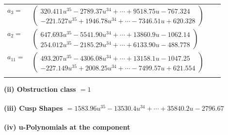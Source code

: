\documentclass[1p]{elsarticle_modified}
\theoremstyle{definition}
\begin{document}
\begin{tabular}{m{7pt} m{180pt} m{7pt} m{180pt} }
\flushright $a_{3}=$&$\begin{pmatrix}320.411 u^{35}-2789.37 u^{34}+\cdots+9518.75 u-767.324\\-221.527 u^{35}+1946.78 u^{34}+\cdots-7346.51 u+620.328\end{pmatrix}$ \\
\flushright $a_{2}=$&$\begin{pmatrix}647.693 u^{35}-5541.90 u^{34}+\cdots+13860.9 u-1062.14\\254.012 u^{35}-2185.29 u^{34}+\cdots+6133.90 u-488.778\end{pmatrix}$ \\
\flushright $a_{11}=$&$\begin{pmatrix}493.207 u^{35}-4306.08 u^{34}+\cdots+13158.1 u-1047.25\\-227.149 u^{35}+2008.25 u^{34}+\cdots-7499.57 u+621.554\end{pmatrix}$\\&\end{tabular}
\flushleft \textbf{(ii) Obstruction class $= 1$}\\~\\
\flushleft \textbf{(iii) Cusp Shapes $= 1583.96 u^{35}-13530.4 u^{34}+\cdots+35840.2 u-2796.67$}\\~\\
\newpage\renewcommand{\arraystretch}{1}
\flushleft \textbf{(iv) u-Polynomials at the component}\newline \\
\end{document}
